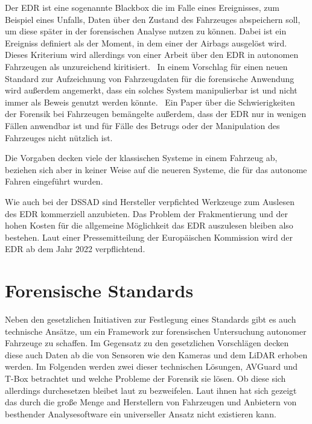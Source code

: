 \documentclass[conference,compsoc,final,a4paper]{IEEEtran}
\begin{document}
Der \ac{EDR} ist eine sogenannte Blackbox die im Falle eines Ereignisses, zum Beispiel eines Unfalls, Daten über den Zustand des Fahrzeuges abspeichern soll, um diese
später in der forensischen Analyse nutzen zu können.
Dabei ist ein Ereigniss definiert als der Moment, in dem einer der Airbags ausgelöst wird.~\cite{NHTSA_2018}
Dieses Kriterium wird allerdings von einer Arbeit über den EDR in autonomen Fahrzeugen als unzureichend kiritisiert.~\cite{Boehm2020}
In einem Vorschlag für einen neuen Standard zur Aufzeichnung von Fahrzeugdaten für die forensische Anwendung wird außerdem angemerkt,
dass ein solches System manipulierbar ist und nicht immer als Beweis genutzt werden könnte.~\cite{LEE_2019}
Ein Paper über die Schwierigkeiten der Forensik bei Fahrzeugen bemängelte außerdem, dass der \ac{EDR} nur in wenigen Fällen anwendbar ist
und für Fälle des Betrugs oder der Manipulation des Fahrzeuges nicht nützlich ist.~\cite{Kopencova_2020}

Die Vorgaben decken viele der klassischen Systeme in einem Fahrzeug ab, beziehen sich aber in keiner Weise auf die neueren Systeme, die für das autonome Fahren eingeführt wurden.

Wie auch bei der DSSAD sind Hersteller verpfichted Werkzeuge zum Auslesen des \ac{EDR} kommerziell anzubieten. Das Problem der Frakmentierung und der hohen Kosten für
die allgemeine Möglichkeit das \ac{EDR} auszulesen bleiben also bestehen.
Laut einer Pressemitteilung der Europäischen Kommission wird der \ac{EDR} ab dem Jahr 2022 verpflichtend.~\cite{EuropeanCommision_2019}

\section{Forensische Standards}

Neben den gesetzlichen Initiativen zur Festlegung eines Standards gibt es auch technische Ansätze, um ein Framework zur forensischen
Untersuchung autonomer Fahrzeuge zu schaffen. Im Gegensatz zu den gesetzlichen Vorschlägen decken diese auch Daten ab die von Sensoren
wie den Kameras und dem \ac{LiDAR} erhoben werden.
Im Folgenden werden zwei dieser technischen Lösungen, AVGuard\cite{Hoque_2021a} und T-Box\cite{Lee_2019} betrachtet und welche Probleme der Forensik sie lösen.
Ob diese sich allerdings durchesetzen bleibet laut  zu bezweifelen. Laut ihnen
hat sich gezeigt das durch die große Menge and Herstellern von Fahrzeugen und Anbietern von besthender Analysesoftware
ein universeller Ansatz nicht existieren kann.
\end{document}
